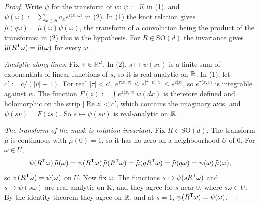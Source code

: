 \begin{proof}
\leanok
Write $\psi$ for the transform of $w$: $\psi := \widehat{w}$ in (1), and
$\psi(\omega) := \sum_{x \in S}a_xe^{i\langle x, \omega\rangle}$ in (2). In (1) the knot relation
gives $\widehat\mu(q\omega) = \widehat\mu(\omega)\psi(\omega)$, the transform of a convolution being
the product of the transforms; in (2) this is the hypothesis. For $R \in \mathrm{SO}(d)$ the
invariance gives $\widehat\mu(R^{\mathsf{T}}\omega) = \widehat\mu(\omega)$ for every $\omega$.

\emph{Analytic along lines.} Fix $v \in \mathbb{R}^d$. In (2), $s \mapsto \psi(sv)$ is a finite sum of
exponentials of linear functions of $s$, so it is real-analytic on $\mathbb{R}$. In (1), let
$c' := c/(|v| + 1)$. For real $|\tau| < c'$, $e^{\tau\langle x, v\rangle} \le
e^{|\tau|\,|v|\,|x|} \le e^{c|x|}$, so $e^{\tau\langle x, v\rangle}$ is integrable against $w$. The
function $F(z) := \int e^{z\langle x, v\rangle}\,w(dx)$ is therefore defined and holomorphic on the
strip $|\operatorname{Re}z| < c'$, which contains the imaginary axis, and $\psi(sv) = F(is)$. So
$s \mapsto \psi(sv)$ is real-analytic on $\mathbb{R}$.

\emph{The transform of the mask is rotation invariant.} Fix $R \in \mathrm{SO}(d)$. The transform
$\widehat\mu$ is continuous with $\widehat\mu(0) = 1$, so it has no zero on a neighbourhood $U$ of
$0$. For $\omega \in U$,
\[
\psi(R^{\mathsf{T}}\omega)\,\widehat\mu(\omega) = \psi(R^{\mathsf{T}}\omega)\,\widehat\mu(R^{\mathsf{T}}\omega)
= \widehat\mu(qR^{\mathsf{T}}\omega) = \widehat\mu(q\omega) = \psi(\omega)\,\widehat\mu(\omega),
\]
so $\psi(R^{\mathsf{T}}\omega) = \psi(\omega)$ on $U$. Now fix $\omega$. The functions
$s \mapsto \psi(sR^{\mathsf{T}}\omega)$ and $s \mapsto \psi(s\omega)$ are real-analytic on $\mathbb{R}$, and they
agree for $s$ near $0$, where $s\omega \in U$. By the identity theorem they agree on $\mathbb{R}$, and at
$s = 1$, $\psi(R^{\mathsf{T}}\omega) = \psi(\omega)$.


\end{proof}
